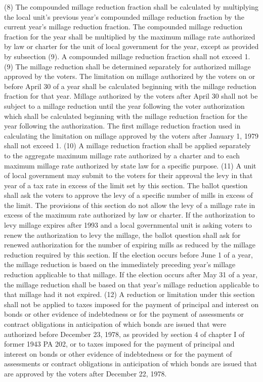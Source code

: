 \documentclass[12pt,\documentclassflag]{michiganCourtOfAppealsBrief}
\begin{document}
  (8) The compounded millage reduction fraction shall be calculated by multiplying the local unit's previous year's compounded millage reduction fraction by the current year's millage reduction fraction. The compounded millage reduction fraction for the year shall be multiplied by the maximum millage rate authorized by law or charter for the unit of local government for the year, except as provided by subsection (9). A compounded millage reduction fraction shall not exceed 1.
  (9) The millage reduction shall be determined separately for authorized millage approved by the voters. The limitation on millage authorized by the voters on or before April 30 of a year shall be calculated beginning with the millage reduction fraction for that year. Millage authorized by the voters after April 30 shall not be subject to a millage reduction until the year following the voter authorization which shall be calculated beginning with the millage reduction fraction for the year following the authorization. The first millage reduction fraction used in calculating the limitation on millage approved by the voters after January 1, 1979 shall not exceed 1.
  (10) A millage reduction fraction shall be applied separately to the aggregate maximum millage rate authorized by a charter and to each maximum millage rate authorized by state law for a specific purpose.
  (11) A unit of local government may submit to the voters for their approval the levy in that year of a tax rate in excess of the limit set by this section. The ballot question shall ask the voters to approve the levy of a specific number of mills in excess of the limit. The provisions of this section do not allow the levy of a millage rate in excess of the maximum rate authorized by law or charter. If the authorization to levy millage expires after 1993 and a local governmental unit is asking voters to renew the authorization to levy the millage, the ballot question shall ask for renewed authorization for the number of expiring mills as reduced by the millage reduction required by this section. If the election occurs before June 1 of a year, the millage reduction is based on the immediately preceding year's millage reduction applicable to that millage. If the election occurs after May 31 of a year, the millage reduction shall be based on that year's millage reduction applicable to that millage had it not expired.
  (12) A reduction or limitation under this section shall not be applied to taxes imposed for the payment of principal and interest on bonds or other evidence of indebtedness or for the payment of assessments or contract obligations in anticipation of which bonds are issued that were authorized before December 23, 1978, as provided by section 4 of chapter I of former 1943 PA 202, or to taxes imposed for the payment of principal and interest on bonds or other evidence of indebtedness or for the payment of assessments or contract obligations in anticipation of which bonds are issued that are approved by the voters after December 22, 1978.
\end{document}

